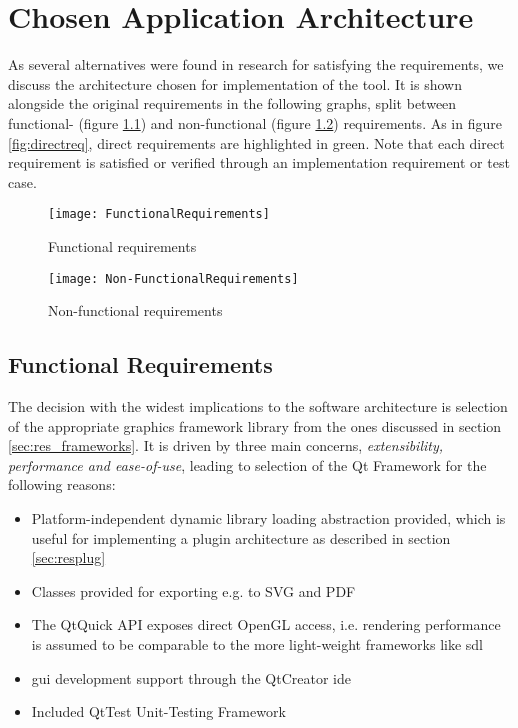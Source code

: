 \chapter{Chosen Application Architecture}
As several alternatives were found in research for satisfying the requirements, we discuss the architecture chosen for implementation of the  tool. It is shown alongside the original requirements in the following graphs, split between functional- (figure \ref{fr}) and non-functional (figure \ref{nfr}) requirements. As in figure \ref{fig:directreq}, direct requirements are highlighted in green. Note that each direct requirement is satisfied or verified through an implementation requirement or test case.

\begin{figure}[p]
	\texttt{[image: FunctionalRequirements]}
	\caption{Functional requirements}
	\label{fr}
\end{figure}

\begin{figure}[p]
	\texttt{[image: Non-FunctionalRequirements]}
	\caption{Non-functional requirements}
	\label{nfr}
\end{figure}

\section{Functional Requirements}
The decision with the widest implications to the software architecture is selection of the appropriate graphics framework library from the ones discussed in section \ref{sec:res_frameworks}.
It is driven by three main concerns, \emph{extensibility, performance and ease-of-use}, leading to selection of the Qt Framework for the following reasons:
\begin{itemize}
	\item Platform-independent dynamic library loading abstraction provided, which is useful for implementing a plugin architecture as described in section \ref{sec:resplug}
	\item Classes provided for exporting e.g. to SVG and PDF
	\item The QtQuick API exposes direct OpenGL access, i.e. rendering performance is assumed to be comparable to the more light-weight frameworks like \gls{sdl}
	\item \gls{gui} development support through the QtCreator \gls{ide}
	\item Included QtTest Unit-Testing Framework
\end{itemize}

